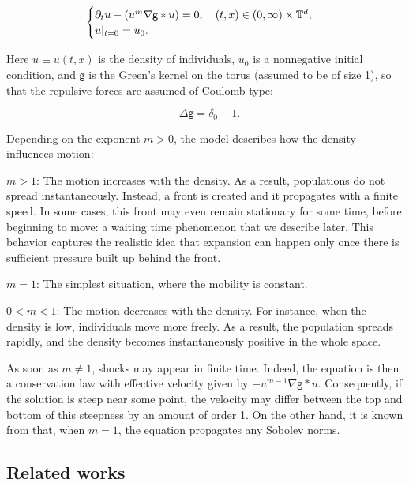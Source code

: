 \documentclass[11pt]{article}
\numberwithin{equation}{section} %
\newcommand{\p}{{\partial}}
\newcommand{\T}{{\mathbb{T}}}
\newcommand{\g}{{\mathsf{g}}}
\let\div\relax
\DeclareMathOperator{\div}{\mathsf{div}}
\def\nab{\nabla}
\begin{document}
\begin{equation}\label{eq:PDE}
\begin{cases}
    \p_t u -\div (u^m \nab\g\ast u) = 0, \quad (t,x)\in (0,\infty)\times \T^d,\\
    u\vert_{t=0} = u_0.
\end{cases}
\end{equation}

Here $u\equiv u(t,x)$ is the density of individuals, $u_{0}$ is a nonnegative initial condition, and $\g$ is the Green's kernel on the torus (assumed to be of size 1), so that the repulsive forces are assumed of Coulomb type: 

\begin{equation}\label{eq:green_kernel}
-\Delta \g = \delta_{0}-1.  
\end{equation}


Depending on the exponent $m>0$, the model describes how the density influences motion:

\underline{$m>1$}: The motion increases with the density. As a result, populations do not spread instantaneously. Instead, a front is created and it propagates with a finite speed. In some cases, this front may even remain stationary for some time, before beginning to move: a waiting time phenomenon that we describe later. This behavior captures the realistic idea that expansion can happen only once there is sufficient pressure built up behind the front. 

\underline{$m=1$}: The simplest situation, where the mobility is constant.

\underline{$0<m<1$}: The motion decreases with the density. For instance, when the density is low, individuals move more freely. As a result, the population spreads rapidly, and the density becomes instantaneously positive in the whole space. 


As soon as $m\ne 1$, shocks may appear in finite time. Indeed, the equation is then a conservation law with effective velocity given by $-u^{m-1}\nab\g\ast u$. Consequently, if the solution is steep near some point, the velocity may differ between the top and bottom of this steepness by an amount of order 1. On the other hand, it is known from \cite{MR1739596} that, when $m=1$, the equation propagates any Sobolev norms.

\subsection{Related works}
\end{document}
